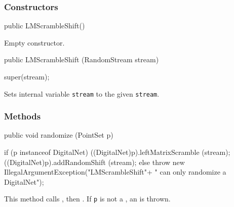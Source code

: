 \subsubsection*{Constructors}
\begin{code}

   public LMScrambleShift() \begin{hide} {
   }
   \end{hide}
\end{code}
\begin{tabb}
   Empty constructor.
\end{tabb}
\begin{code}

   public LMScrambleShift (RandomStream stream) \begin{hide} {
       super(stream);
   }
   \end{hide}
\end{code}
\begin{tabb}
   Sets internal variable \texttt{stream} to the given
   \texttt{stream}.
\end{tabb}
\begin{htmlonly}
\end{htmlonly}

\subsubsection*{Methods}
\begin{code}

   public void randomize (PointSet p) \begin{hide} {
      if (p instanceof DigitalNet) {
         ((DigitalNet)p).leftMatrixScramble (stream);
         ((DigitalNet)p).addRandomShift (stream);
      } else {
         throw new IllegalArgumentException("LMScrambleShift"+
                                            " can only randomize a DigitalNet");
      }
   }
   \end{hide}
\end{code}
\begin{tabb}
   This method calls
   ,
   then
   .
   If \texttt{p} is not a
   , an
 is thrown.
\end{tabb}
\begin{htmlonly}
\end{htmlonly}
\begin{code}\begin{hide}
}
\end{hide}\end{code}
